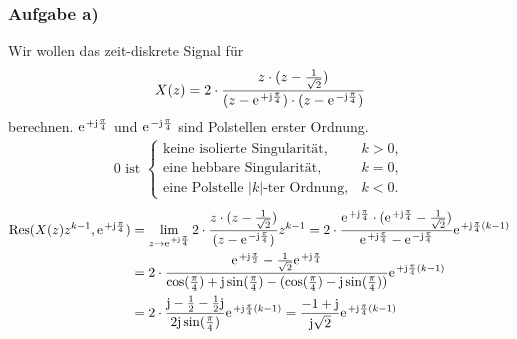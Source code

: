 \documentclass[11pt,a4paper,DIV=12]{scrartcl}
\begin{document}
\subsubsection{Aufgabe a)}
Wir wollen das zeit-diskrete Signal für
\begin{align}
	X(z)=2\cdot\frac{z\cdot(z-\frac{1}{\sqrt{2}})}{(z-\e^{+\im\frac{\pi}{4}})\cdot(z-\e^{-\im\frac{\pi}{4}})}
\end{align}
berechnen.
$\e^{+\im\frac{\pi}{4}}$ und $\e^{-\im\frac{\pi}{4}}$ sind Polstellen erster Ordnung.\\
\begin{align}
	0\text{ ist }
	\begin{cases}
		\text{keine isolierte Singularität}, &k > 0, \\
		\text{eine hebbare Singularität}, &k = 0, \\
		\text{eine Polstelle }|k|\text{-ter Ordnung}, &k <0.
	\end{cases}
\end{align}
\begin{align}
	\mathrm{Res}(X(z)z^{k-1},\e^{+\im\frac{\pi}{4}})&=\lim\limits_{z\rightarrow\e^{+\im\frac{\pi}{4}}}2\cdot\frac{z\cdot(z-\frac{1}{\sqrt{2}})}{(z-\e^{-\im\frac{\pi}{4}})}z^{k-1}=2\cdot\frac{\e^{+\im\frac{\pi}{4}}\cdot(\e^{+\im\frac{\pi}{4}}-\frac{1}{\sqrt{2}})}{\e^{+\im\frac{\pi}{4}}-\e^{-\im\frac{\pi}{4}}}\e^{+\im\frac{\pi}{4}(k-1)} \nonumber \\
	&=2\cdot\frac{\e^{+\im\frac{\pi}{2}}-\frac{1}{\sqrt{2}}\e^{+\im\frac{\pi}{4}}}{\cos(\frac{\pi}{4})+\im\sin(\frac{\pi}{4})-(\cos(\frac{\pi}{4})-\im\sin(\frac{\pi}{4}))}\e^{+\im\frac{\pi}{4}(k-1)}\nonumber\\
	&=2\cdot\frac{\im-\frac{1}{2}-\frac{1}{2}\im}{2\im\sin(\frac{\pi}{4})}\e^{+\im\frac{\pi}{4}(k-1)}=\frac{-1+\im}{\im\sqrt{2}}\e^{+\im\frac{\pi}{4}(k-1)}
\end{align}
\end{document}
